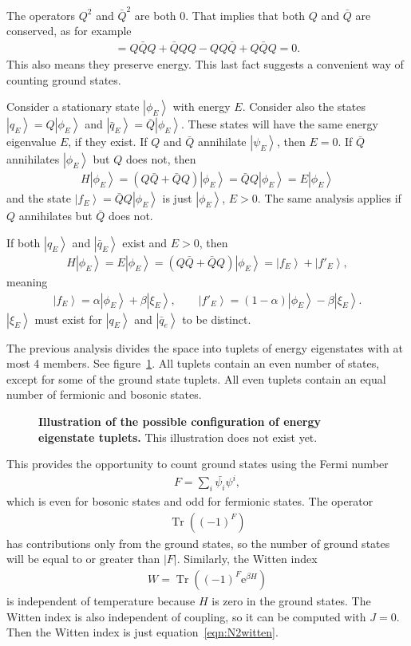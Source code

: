\documentclass[12pt]{article} %
\newcommand{\e}{\text{e}}
\newcommand{\ket}[1]{\left|#1\right\rangle}
\DeclareMathOperator{\Tr}{Tr}
\begin{document}
The operators $Q^2$ and $\bar Q^2$ are both 0. That implies that both $Q$ and $\bar Q$ are conserved, as for example
\begin{align}
[H,Q] = Q\bar QQ + \bar QQQ - QQ\bar Q + Q\bar QQ = 0.
\end{align}
This also means they preserve energy. This last fact suggests a convenient way of counting ground states.

Consider a stationary state $\ket{\phi_E}$ with energy $E$. Consider also the states $\ket{q_E} = Q\ket{\phi_E}$ and $\ket{\bar q_E}= \bar Q \ket{\phi_E}$. These states will have the same energy eigenvalue $E$, if they exist. If $Q$ and $\bar Q$ annihilate $\ket{\psi_E}$, then $E=0$. If $\bar Q$ annihilates $\ket{\phi_E}$ but $Q$ does not, then 
\begin{align}
H\ket{\phi_E} = (Q\bar{Q} + \bar QQ)\ket{\phi_E} = \bar QQ\ket{\phi_E} = E\ket{\phi_E}
\end{align}
and the state $\ket{f_E} = \bar QQ\ket{\phi_E}$ is just $\ket{\phi_E}$, $E>0$. The same analysis applies if $Q$ annihilates but $\bar Q$ does not.

If both $\ket{q_E}$ and $\ket{\bar q_E}$ exist and $E>0$, then
\begin{align}
H\ket{\phi_E} = E\ket{\phi_E} = (Q\bar Q + \bar QQ)\ket{\phi_E} = \ket{f_E} + 
	\ket{f'_E},
\end{align}
meaning 
\begin{align}
\ket{f_E} = \alpha\ket{\phi_E} + \beta\ket{\xi_E},\qquad \ket{f'_E} = 
	(1-\alpha)\ket{\phi_E} - \beta\ket{\xi_E}.
\end{align}
$\ket{\xi_E}$ must exist for $\ket{q_E}$ and $\ket{\bar q_e}$ to be distinct.

The previous analysis divides the space into tuplets of energy eigenstates with at most 4 members. See figure~\ref{fig:tuplets}. All tuplets contain an even number of states, except for some of the ground state tuplets. All even tuplets contain an equal number of fermionic and bosonic states.
\begin{figure}
	\centering 
	\caption{\textbf{Illustration of the possible configuration of energy eigenstate tuplets.} This illustration does not exist yet.}
	\label{fig:tuplets}
\end{figure}

This provides the opportunity to count ground states using the Fermi number
\begin{align}
F = \sum_i\bar{\psi_i}\psi^i,
\end{align}
which is even for bosonic states and odd for fermionic states. The operator 
\begin{align}
\Tr\left((-1)^F\right) \label{eqn:N2witten}
\end{align}
has contributions only from the ground states, so the number of ground states will be equal to or greater than $|F|$. Similarly, the Witten index
\begin{align}
W = \Tr\left((-1)^F\e^{\beta H}\right)
\end{align}
is independent of temperature because $H$ is zero in the ground states. The Witten index is also independent of coupling, so it can be computed with $J=0$. Then the Witten index is just equation~\ref{eqn:N2witten}.
\end{document}
